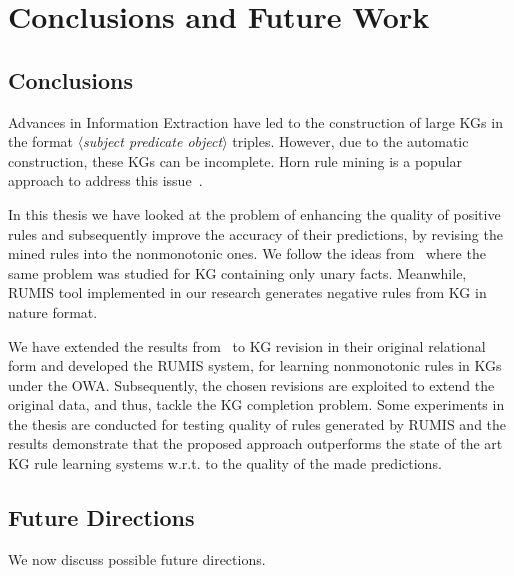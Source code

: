 \chapter{Conclusions and Future Work}
\label{chap:conclusion}

\section{Conclusions}

Advances in Information Extraction have led to the construction of large KGs in the format \textit{$\langle$subject predicate object$\rangle$} triples. However, due to the automatic construction, these KGs can be incomplete. Horn rule mining is a popular approach to address this issue~\cite{ref10}.

In this thesis we have looked at the problem of enhancing the quality of positive rules and subsequently improve the accuracy of their predictions, by revising the mined rules into the nonmonotonic ones. We follow the ideas from~\cite{ref12} where the same problem was studied for KG containing only unary facts. Meanwhile, RUMIS tool implemented in our research generates negative rules from KG in nature format.

We have extended the results from~\cite{ref12} to KG revision in their original relational form and developed the RUMIS system, for learning nonmonotonic rules in KGs under the OWA. Subsequently, the chosen revisions are exploited to extend the original data, and thus, tackle the KG completion problem. Some experiments in the thesis are conducted for testing quality of rules generated by RUMIS and the results demonstrate that the proposed approach outperforms the state of the art KG rule learning systems w.r.t. to the quality of the made predictions.

\section{Future Directions}

We now discuss possible future directions.

